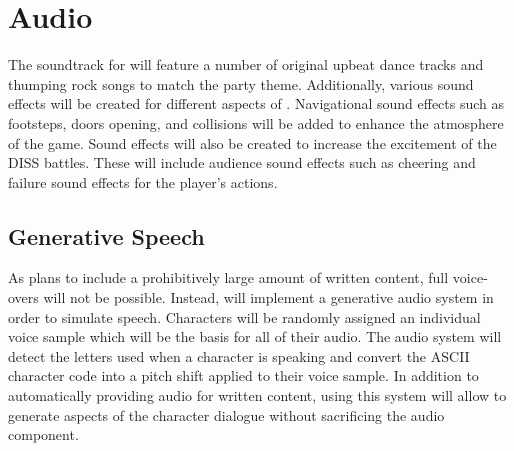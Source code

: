 \section{Audio}
The soundtrack for \ourgame{} will feature a number of original upbeat dance tracks and thumping rock songs to match the party theme. Additionally, various sound effects will be created for different aspects of \ourgame{}. Navigational sound effects such as footsteps, doors opening, and collisions will be added to enhance the atmosphere of the game. Sound effects will also be created to increase the excitement of the DISS battles. These will include audience sound effects such as cheering and failure sound effects for the player's actions. 

\subsection{Generative Speech}
As \ourteam{} plans to include a prohibitively large amount of written content, full voice-overs will not be possible. Instead, \ourgame{} will implement a generative audio system in order to simulate speech. Characters will be randomly assigned an individual voice sample which will be the basis for all of their audio. The audio system will detect the letters used when a character is speaking and convert the ASCII character code into a pitch shift applied to their voice sample. In addition to automatically providing audio for written content, using this system will allow \ourteam{} to generate aspects of the character dialogue without sacrificing the audio component.